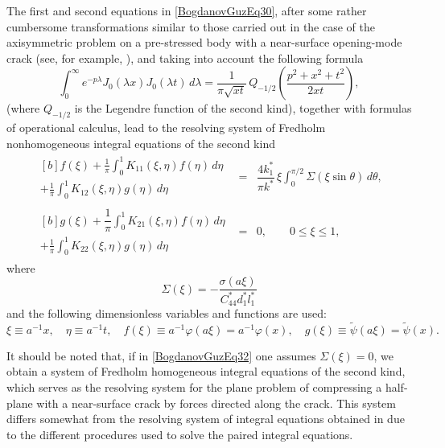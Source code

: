 The first and second equations in \eqref{BogdanovGuzEq30}, after some rather cumbersome transformations similar to those carried out in the case of the axisymmetric problem on a pre-stressed body with a near-surface opening-mode crack (see, for example, \cite{BogdanovGuz32}), and taking into account the following formula \cite{BogdanovGuz23}
\[
\int_{0}^{\infty}
e^{-p\lambda}
J_{0}(\lambda x)
J_{0}(\lambda t)\,d\lambda
=
\frac{1}{\pi\sqrt{xt}}\,
Q_{-1/2}
\!\left(
\frac{p^{2}+x^{2}+t^{2}}{2xt}
\right),
\]
%
(where $Q_{-1/2}$ is the Legendre function of the second kind), together with formulas of operational calculus, lead to the resolving system of Fredholm nonhomogeneous integral equations of the second kind
\begin{equation}
	\label{BogdanovGuzEq32}
	\begin{array}{rcl}
	\begin{multlined}[b]
	f(\xi)
	+
	\frac{1}{\pi}\int_{0}^{1} K_{11}(\xi,\eta)f(\eta)\,d\eta
	\\[-1em]
	+
	\frac{1}{\pi}\int_{0}^{1} K_{12}(\xi,\eta)g(\eta)\,d\eta
	\end{multlined}
	&=&
	\dfrac{4k_{1}^{*}}{\pi k^{*}}
	\,\xi
	\displaystyle\int_{0}^{\pi/2}
	\Sigma(\xi\sin\theta)\,d\theta,
	\\[1em]
	\begin{multlined}[b]
	g(\xi)
	+
	\dfrac{1}{\pi}\int_{0}^{1} K_{21}(\xi,\eta)f(\eta)\,d\eta
	\\[-1em]
	+
	\frac{1}{\pi}\int_{0}^{1} K_{22}(\xi,\eta)g(\eta)\,d\eta
	\end{multlined}
	&=&
	0,
	\qquad
	0\le \xi \le 1,
	\end{array}
\end{equation}
where
\[
\Sigma(\xi)
=
-\frac{\sigma(a\xi)}{C_{44}^{*} d_{1}^{*} l_{1}^{*}} 
\]
and the following dimensionless variables and functions are used:
\begin{equation}
	\label{BogdanovGuzEq33}
	\xi \equiv a^{-1}x,
	\quad
	\eta \equiv a^{-1}t,
	\quad
	f(\xi)\equiv a^{-1}\varphi(a\xi)=a^{-1}\varphi(x),
	\quad
	g(\xi)\equiv \tilde{\psi}(a\xi)=\tilde{\psi}(x).
\end{equation}

It should be noted that, if in \eqref{BogdanovGuzEq32} one assumes $\Sigma(\xi)=0$, we obtain a system of Fredholm homogeneous integral equations of the second kind, which serves as the resolving system for the plane problem of compressing a half-plane with a near-surface crack by forces directed along the crack. This system differs somewhat from the resolving system of integral equations obtained in \cite{BogdanovGuz31} due to the different procedures used to solve the paired integral equations.

